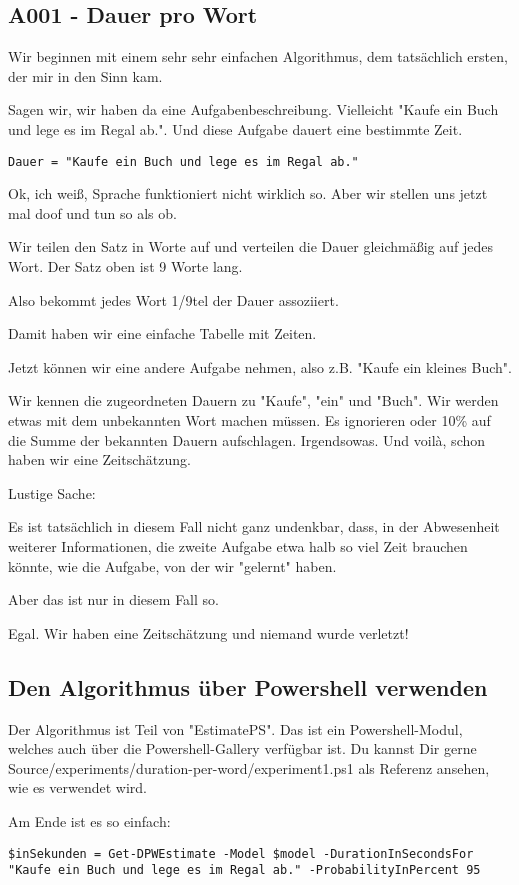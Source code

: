 \newpage{}

\subsection{A001 - Dauer pro Wort}

Wir beginnen mit einem sehr sehr einfachen Algorithmus, dem tatsächlich ersten, 
der mir in den Sinn kam.

Sagen wir, wir haben da eine Aufgabenbeschreibung. Vielleicht "Kaufe ein Buch
und lege es im Regal ab.". Und diese Aufgabe dauert eine bestimmte Zeit.

\begin{verbatim}
Dauer = "Kaufe ein Buch und lege es im Regal ab."
\end{verbatim}

Ok, ich weiß, Sprache funktioniert nicht wirklich so. 
Aber wir stellen uns jetzt mal doof und tun so als ob.
 
Wir teilen den Satz in Worte auf und 
verteilen die Dauer gleichmäßig auf jedes Wort. Der Satz oben ist 9 Worte lang.

Also bekommt jedes Wort 1/9tel der Dauer assoziiert.

Damit haben wir eine einfache Tabelle mit Zeiten.

Jetzt können wir eine andere Aufgabe nehmen, also z.B. "Kaufe ein kleines Buch".

Wir kennen die zugeordneten Dauern zu "Kaufe", "ein" und "Buch". Wir 
werden etwas mit dem unbekannten Wort machen müssen. Es ignorieren oder 10\%
auf die Summe der bekannten Dauern aufschlagen. Irgendsowas. Und voilà, 
schon haben wir eine Zeitschätzung.

Lustige Sache:

Es ist tatsächlich in diesem Fall nicht ganz undenkbar, dass, in der Abwesenheit
weiterer Informationen, die zweite Aufgabe etwa halb so viel Zeit brauchen
könnte, wie die Aufgabe, von der wir "gelernt" haben.

Aber das ist nur in diesem Fall so. 

Egal. Wir haben eine Zeitschätzung und niemand wurde verletzt!

\subsection{Den Algorithmus über Powershell verwenden}

Der Algorithmus ist Teil von "EstimatePS". Das ist ein Powershell-Modul, 
welches auch über die Powershell-Gallery verfügbar ist.
Du kannst Dir gerne Source/experiments/duration-per-word/experiment1.ps1 als 
Referenz ansehen, wie es verwendet wird.

Am Ende ist es so einfach:

\begin{verbatim}
$inSekunden = Get-DPWEstimate -Model $model -DurationInSecondsFor "Kaufe ein Buch und lege es im Regal ab." -ProbabilityInPercent 95
\end{verbatim}

